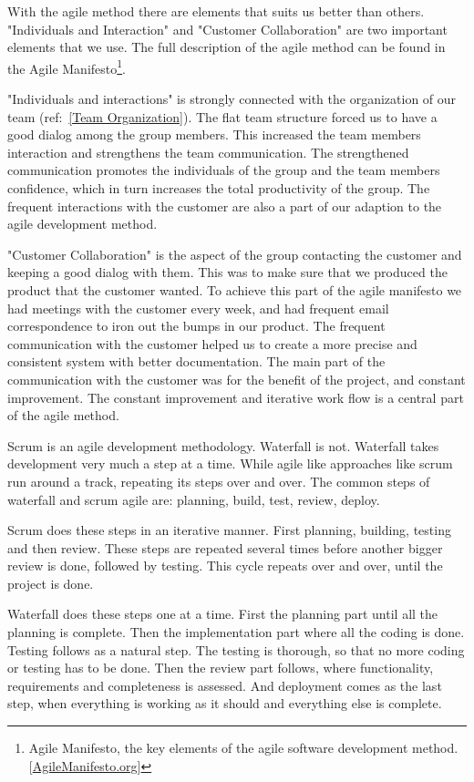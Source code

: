    With the agile method there are elements that suits us better than others. "Individuals and Interaction" and "Customer Collaboration" are two important elements that we use. The full description of the agile method can be found in the Agile Manifesto\footnote
        {Agile Manifesto, the key elements of the agile software development method. [\href{http://http://agilemanifesto.org/}{AgileManifesto.org}]}.
    
    "Individuals and interactions" is strongly connected with the organization of our team (ref:~\ref{Team Organization}). The flat team structure forced us to have a good dialog among the group members. This increased the team members interaction and strengthens the team communication. The strengthened communication promotes the individuals of the group and the team members confidence, which in turn increases the total productivity of the group. The frequent interactions with the customer are also a part of our adaption to the agile development method. 
    
    "Customer Collaboration" is the aspect of the group contacting the customer and keeping a good dialog with them. This was to make sure that we produced the product that the customer wanted. To achieve this part of the agile manifesto we had meetings with the customer every week, and had frequent email correspondence to iron out the bumps in our product. The frequent communication with the customer helped us to create a more precise and consistent system with better documentation. The main part of the communication with the customer was for the benefit of the project, and constant improvement. The constant improvement and iterative work flow is a central part of the agile method. 
    
    Scrum is an agile development methodology. Waterfall is not. Waterfall takes development very much a step at a time. While agile like approaches like scrum run around a track, repeating its steps over and over. The common steps of waterfall and scrum agile are: planning, build, test, review, deploy. 
               
    Scrum does these steps in an iterative manner. First planning, building, testing and then review. These steps are repeated several times before another bigger review is done, followed by testing. This cycle repeats over and over, until the project is done. 
    
    Waterfall  does these steps one at a time. First the planning part until all the planning is complete. Then the implementation part where all the coding is done. Testing follows as a natural step. The testing is thorough, so that no more coding or testing has to be done. Then the review part follows, where functionality, requirements and completeness is assessed. And deployment comes as the last step, when everything is working as it should and everything else is complete.  
    

